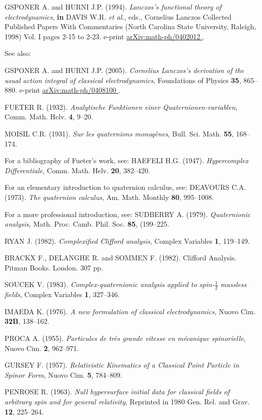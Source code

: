 \documentclass [12pt,a4paper      ]{article}
\begin{document}
\begin{enumerate}
 GSPONER A.  and HURNI J.P. (1994). \emph{Lanczos's functional theory of electrodynamics},  {\bf in} DAVIS W.R. \emph{et al.}, eds., Cornelius Lanczos Collected Published Papers With Commentaries (North Ca\-rolina State University, Raleigh, 1998) Vol. I pages 2-15 to 2-23. e-print \underline{ arXiv:math-ph/0402012 }.

See also:

GSPONER A.  and HURNI J.P. (2005). \emph{Cornelius Lanczos's derivation of the usual action integral of classical electrodynamics}, Foundations of Physics {\bf  35}, 865--880. e-print \underline{ arXiv:math-ph/0408100 }.
 
  FUETER R.  (1932). \emph{Analytische Funktionen einer  Quaternionen-variablen}, Comm. Math. Helv.   {\bf 4}, 9--20.

MOISIL C.R. (1931). \emph{Sur les quaternions monog\`enes},  Bull. Sci. 
Math.  {\bf  55}, 168--174.

For a bibliography of Fueter's work, see:
HAEFELI H.G.  (1947). \emph{Hypercomplex Differentiale}, Comm. Math. 
Helv.  {\bf  20}, 382--420.

For an elementary introduction to quaternion calculus, see:
DEAVOURS C.A.  (1973). \emph{The quaternion calculus},  Am.  Math. 
Monthly  {\bf  80}, 995--1008.

For a more professional introduction, see: SUDBERRY A.  (1979). \emph{Quaternionic analysis}, Math. Proc. Camb. Phil. 
Soc.  {\bf  85}, (199--225.

  RYAN  J.   (1982). \emph{Complexified  Clifford  analysis}, Complex Variables   {\bf 1}, 119--149.

BRACKX  F.,  DELANGHE R.  and SOMMEN F.  (1982). Clifford  Analysis.  
Pitman Books. London. 307 pp.

SOUCEK V.  (1983). \emph{Complex-quaternionic analysis applied to spin-$\tfrac{1}{2}$ massless fields},  Complex Variables  {\bf 1}, 327--346.

   IMAEDA   K.   (1976).  \emph{A  new   formulation   of   classical electrodynamics}, Nuovo Cim.  {\bf 32B}, 138--162.


 PROCA  A. (1955). \emph{Particules de tr\`es grande vitesse  en  
m\'ecanique spinorielle}, Nuovo Cim.  {\bf 2}, 962--971.

GURSEY  F.  (1957). \emph{Relativistic Kinematics of  a  Classical  Point 
Particle in Spinor Form}, Nuovo Cim.   {\bf 5}, 784--809.

PENROSE R. (1963). \emph{Null hypersurface initial data for classical fields  of arbitrary spin and for general  relativity}, Reprinted  in
1980  Gen. Rel. and Grav.  {\bf 12}, 225--264.



\end{enumerate}
\end{document}
